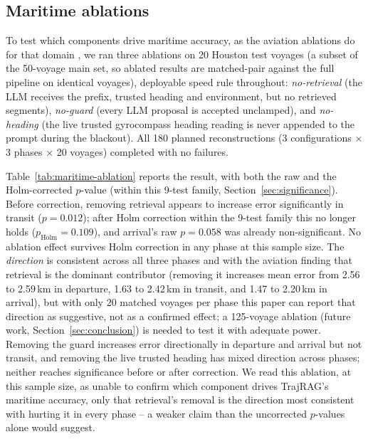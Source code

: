 \subsection{Maritime ablations}
\label{sec:maritime-ablations}

To test which components drive maritime accuracy, as the aviation ablations
do for that domain \citep{felendler2026trajrag}, we ran three ablations on
20 Houston test voyages (a subset of the 50-voyage main set, so ablated
results are matched-pair against the full pipeline on identical voyages),
deployable speed rule throughout: \emph{no-retrieval} (the LLM receives the
prefix, trusted heading and environment, but no retrieved segments),
\emph{no-guard} (every LLM proposal is accepted unclamped), and
\emph{no-heading} (the live trusted gyrocompass heading reading is never
appended to the prompt during the blackout). All 180 planned reconstructions
(3 configurations $\times$ 3 phases $\times$ 20 voyages) completed with no
failures.

Table~\ref{tab:maritime-ablation} reports the result, with both the raw
and the Holm-corrected $p$-value (within this 9-test family,
Section~\ref{sec:significance}). Before correction, removing retrieval
appears to increase error significantly in transit ($p=0.012$); after Holm
correction within the 9-test family this no longer holds
($p_{\text{Holm}}=0.109$), and arrival's raw $p=0.058$ was already
non-significant. No ablation effect survives Holm correction in any phase
at this sample size. The \emph{direction} is consistent across all three
phases and with the aviation finding that retrieval is the dominant
contributor (removing it increases mean error from 2.56 to 2.59\,km in
departure, 1.63 to 2.42\,km in transit, and 1.47 to 2.20\,km in arrival),
but with only 20 matched voyages per phase this paper can report that
direction as suggestive, not as a confirmed effect; a 125-voyage ablation
(future work, Section~\ref{sec:conclusion}) is needed to test it with
adequate power. Removing the guard increases error directionally in
departure and arrival but not transit, and removing the live trusted
heading has mixed direction across phases; neither reaches significance
before or after correction. We read this ablation, at this sample size, as
unable to confirm which component drives TrajRAG's maritime accuracy, only
that retrieval's removal is the direction most consistent with hurting it
in every phase -- a weaker claim than the uncorrected $p$-values alone
would suggest.

